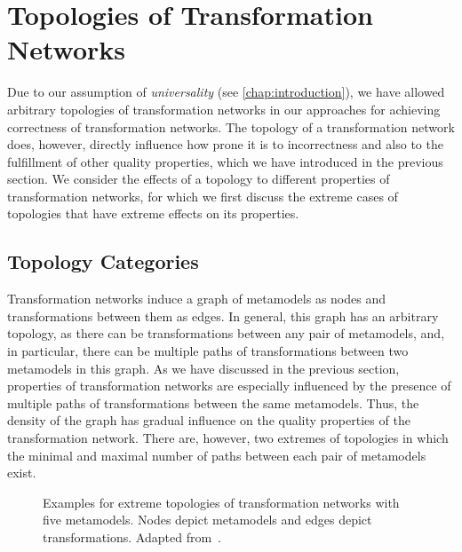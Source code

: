 \section{Topologies of Transformation Networks}
\label{chap:classification:topologies}

Due to our assumption of \emph{universality} (see \autoref{chap:introduction}), we have allowed arbitrary topologies of transformation networks in our approaches for achieving correctness of transformation networks.
The topology of a transformation network does, however, directly influence how prone it is to incorrectness and also to the fulfillment of other quality properties, which we have introduced in the previous section.
We consider the effects of a topology to different properties of transformation networks, for which we first discuss the extreme cases of topologies that have extreme effects on its properties.


\subsection{Topology Categories}

Transformation networks induce a graph of metamodels as nodes and transformations between them as edges.
In general, this graph has an arbitrary topology, as there can be transformations between any pair of metamodels, and, in particular, there can be multiple paths of transformations between two metamodels in this graph.
As we have discussed in the previous section, properties of transformation networks are especially influenced by the presence of multiple paths of transformations between the same metamodels.
Thus, the density of the graph has gradual influence on the quality properties of the transformation network.
There are, however, two extremes of topologies in which the minimal and maximal number of paths between each pair of metamodels exist.

\begin{figure}
    \centering
    \begin{minipage}[b]{0.49\columnwidth}
        \centering
        
        \label{fig:classification:topologies:complete}
    \end{minipage}
    \hfill
    \begin{minipage}[b]{0.49\columnwidth}
        \centering
        
        \vspace{1em}
        \label{fig:classification:topologies:tree}
    \end{minipage}
    \caption[Extremes of transformation network topologies]{Examples for extreme topologies of transformation networks with five metamodels. Nodes depict metamodels and edges depict transformations. Adapted from~.}
    \label{fig:classification:topologies}
\end{figure}

